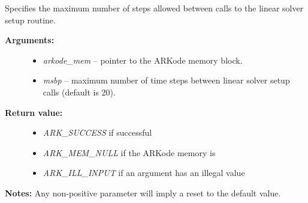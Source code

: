 \documentclass[letterpaper,10pt,english]{sphinxmanual}
\begin{document}
\begin{fulllineitems}
\label{c_interface/User_callable:ARKodeSetMaxStepsBetweenLSet}
Specifies the maximum number of steps allowed between calls to the
linear solver setup routine.
\begin{description}
\item[{\textbf{Arguments:}}] \leavevmode\begin{itemize}
\item {} 
\emph{arkode\_mem} -- pointer to the ARKode memory block.

\item {} 
\emph{msbp} -- maximum number of time steps between linear solver
setup calls (default is 20).

\end{itemize}

\item[{\textbf{Return value:}}] \leavevmode\begin{itemize}
\item {} 
\emph{ARK\_SUCCESS} if successful

\item {} 
\emph{ARK\_MEM\_NULL} if the ARKode memory is 

\item {} 
\emph{ARK\_ILL\_INPUT} if an argument has an illegal value

\end{itemize}

\end{description}

\textbf{Notes:}  Any non-positive parameter will imply a reset to the default value.

\end{fulllineitems}

\end{document}
